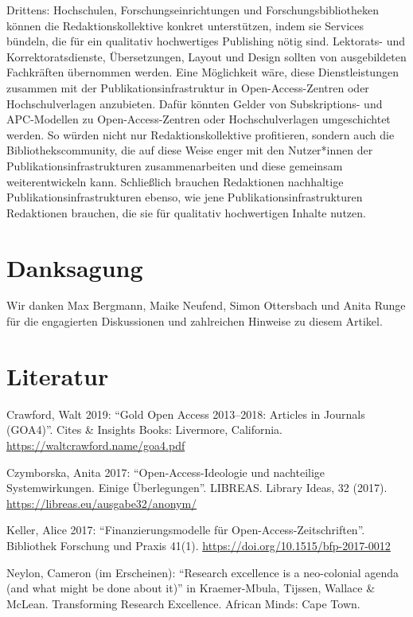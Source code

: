 \documentclass[a4paper,
fontsize=11pt,
oneside,
numbers=noperiodatend,
parskip=half-,
bibliography=totoc,
final
]{scrartcl}
\begin{document}
Drittens: Hochschulen, Forschungseinrichtungen und
Forschungsbibliotheken können die Redaktionskollektive konkret
unterstützen, indem sie Services bündeln, die für ein qualitativ
hochwertiges Publishing nötig sind. Lektorats- und Korrektoratsdienste,
Übersetzungen, Layout und Design sollten von ausgebildeten Fachkräften
übernommen werden. Eine Möglichkeit wäre, diese Dienstleistungen
zusammen mit der Publikationsinfrastruktur in Open-Access-Zentren oder
Hochschulverlagen anzubieten. Dafür könnten Gelder von Subskriptions-
und APC-Modellen zu Open-Access-Zentren oder Hochschulverlagen
umgeschichtet werden. So würden nicht nur Redaktionskollektive
profitieren, sondern auch die Bibliothekscommunity, die auf diese Weise
enger mit den Nutzer*innen der Publikationsinfrastrukturen
zusammenarbeiten und diese gemeinsam weiterentwickeln kann. Schließlich
brauchen Redaktionen nachhaltige Publikationsinfrastrukturen ebenso, wie
jene Publikationsinfrastrukturen Redaktionen brauchen, die sie für
qualitativ hochwertigen Inhalte nutzen.

\hypertarget{danksagung}{%
\section*{Danksagung}\label{danksagung}}

Wir danken Max Bergmann, Maike Neufend, Simon Ottersbach und Anita Runge
für die engagierten Diskussionen und zahlreichen Hinweise zu diesem
Artikel.

\hypertarget{literatur}{%
\section*{Literatur}\label{literatur}}

Crawford, Walt 2019: \enquote{Gold Open Access 2013--2018: Articles in
Journals (GOA4)}. Cites \& Insights Books: Livermore, California.
\url{https://waltcrawford.name/goa4.pdf}

Czymborska, Anita 2017: \enquote{Open-Access-Ideologie und nachteilige
Systemwirkungen. Einige Überlegungen}. LIBREAS. Library Ideas, 32
(2017). \url{https://libreas.eu/ausgabe32/anonym/}

Keller, Alice 2017: \enquote{Finanzierungsmodelle für
Open-Access-Zeitschriften}. Bibliothek Forschung und Praxis 41(1).
\url{https://doi.org/10.1515/bfp-2017-0012}

Neylon, Cameron (im Erscheinen): \enquote{Research excellence is a
neo-colonial agenda (and what might be done about it)} in Kraemer-Mbula,
Tijssen, Wallace \& McLean. Transforming Research Excellence. African
Minds: Cape Town.
\end{document}
